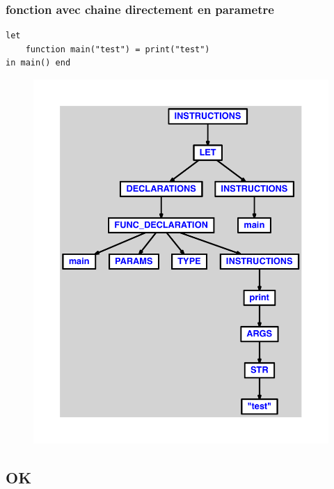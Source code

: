 \documentclass{article}
\begin{document}
\subsubsection{fonction avec chaine directement en parametre}
\begin{lstlisting}
let
	function main("test") = print("test")
in main() end
\end{lstlisting}
\newpage
\begin{figure}[H]
\centering
\includegraphics[max width=\textwidth]{ast/ast_229.pdf}
\end{figure}
\newpage
\subsection{OK}
\end{document}
